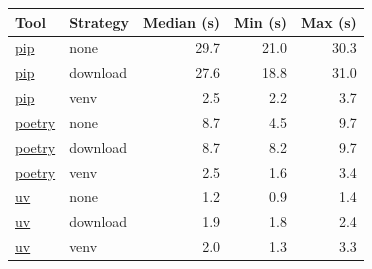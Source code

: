 \begin{tabular}{llrrr}
\toprule
Tool & Strategy & Median (s) & Min (s) & Max (s) \\
\midrule
\href{https://github.com/mark124/cache-key-soundness/blob/v1.0/results/table4_bench.csv\#L2}{pip} & none & 29.7 & 21.0 & 30.3 \\
\href{https://github.com/mark124/cache-key-soundness/blob/v1.0/results/table4_bench.csv\#L3}{pip} & download & 27.6 & 18.8 & 31.0 \\
\href{https://github.com/mark124/cache-key-soundness/blob/v1.0/results/table4_bench.csv\#L4}{pip} & venv & 2.5 & 2.2 & 3.7 \\
\href{https://github.com/mark124/cache-key-soundness/blob/v1.0/results/table4_bench.csv\#L5}{poetry} & none & 8.7 & 4.5 & 9.7 \\
\href{https://github.com/mark124/cache-key-soundness/blob/v1.0/results/table4_bench.csv\#L6}{poetry} & download & 8.7 & 8.2 & 9.7 \\
\href{https://github.com/mark124/cache-key-soundness/blob/v1.0/results/table4_bench.csv\#L7}{poetry} & venv & 2.5 & 1.6 & 3.4 \\
\href{https://github.com/mark124/cache-key-soundness/blob/v1.0/results/table4_bench.csv\#L8}{uv} & none & 1.2 & 0.9 & 1.4 \\
\href{https://github.com/mark124/cache-key-soundness/blob/v1.0/results/table4_bench.csv\#L9}{uv} & download & 1.9 & 1.8 & 2.4 \\
\href{https://github.com/mark124/cache-key-soundness/blob/v1.0/results/table4_bench.csv\#L10}{uv} & venv & 2.0 & 1.3 & 3.3 \\
\bottomrule
\end{tabular}
